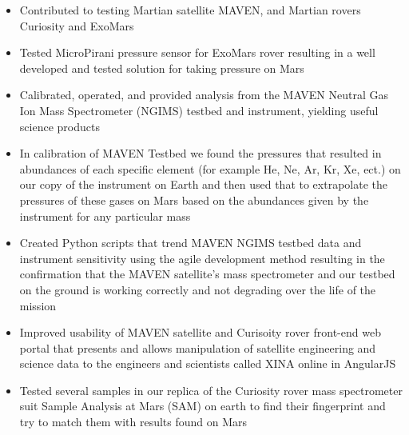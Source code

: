 \documentclass{res}
\begin{document}
\begin{resume}
\begin{itemize}
                \item Contributed to testing Martian satellite MAVEN, and Martian rovers Curiosity and ExoMars
		\item Tested MicroPirani pressure sensor for ExoMars rover resulting in a well developed and tested solution for taking pressure on Mars
		\item Calibrated, operated, and provided analysis from the MAVEN Neutral Gas Ion Mass Spectrometer (NGIMS) testbed and instrument, yielding useful science products
		\item In calibration of MAVEN Testbed we found the pressures that resulted in abundances of each specific element (for example He, Ne, Ar, Kr, Xe, ect.) on our copy of the instrument on Earth and then used that to extrapolate the pressures of these gases on Mars based on the abundances given by the instrument for any particular mass
		\item Created Python scripts that trend MAVEN NGIMS testbed data and instrument sensitivity using the agile development method resulting in the confirmation that the MAVEN satellite's mass spectrometer and our testbed on the ground is working correctly and not degrading over the life of the mission
		\item Improved usability of MAVEN satellite and Curisoity rover front-end web portal that presents and allows manipulation of satellite engineering and science data to the engineers and scientists called XINA online in AngularJS
		\item Tested several samples in our replica of the Curiosity rover mass spectrometer suit Sample Analysis at Mars (SAM) on earth to find their fingerprint and try to match them with results found on Mars
                \end{itemize}


\end{resume}
\end{document}
